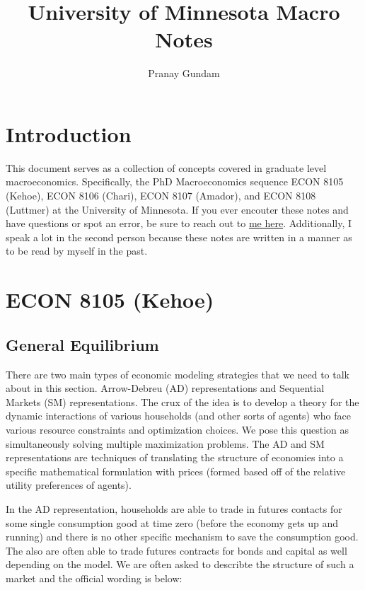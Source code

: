 \documentclass[11pt,english]{article}
\title{\textbf{University of Minnesota Macro Notes}}
\author{Pranay Gundam}
\begin{document}
\maketitle

\tableofcontents

\section{Introduction}

This document serves as a collection of concepts covered in graduate level macroeconomics. Specifically, the PhD Macroeconomics sequence ECON 8105 (Kehoe), ECON 8106 (Chari), ECON 8107 (Amador), and ECON 8108 (Luttmer) at the University of Minnesota. If you ever encouter these notes and have questions or spot an error, be sure to reach out to \href{mailto:pranaygundam00@gmail.com}{me here}. Additionally, I speak a lot in the second person because these notes are written in a manner as to be read by myself in the past.

\section{ECON 8105 (Kehoe)}

\subsection{General Equilibrium}

There are two main types of economic modeling strategies that we need to talk about in this section. Arrow-Debreu (AD) representations and Sequential Markets (SM) representations. The crux of the idea is to develop a theory for the dynamic interactions of various households (and other sorts of agents) who face various resource constraints and optimization choices. We pose this question as simultaneously solving multiple maximization problems. The AD and SM representations are techniques of translating the structure of economies into a specific mathematical formulation with prices (formed based off of the relative utility preferences of agents).

In the AD representation, households are able to trade in futures contacts for some single consumption good at time zero (before the economy gets up and running) and there is no other specific mechanism to save the consumption good. The also are often able to trade futures contracts for bonds and capital as well depending on the model. We are often asked to describte the structure of such a market and the official wording is below:
\end{document}
